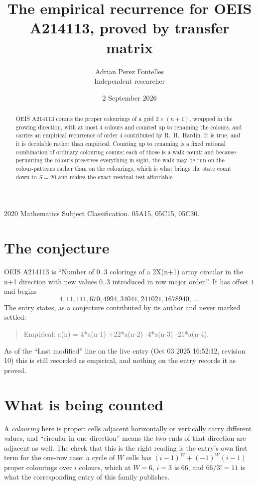 \documentclass[11pt,a4paper]{article}
\title{The empirical recurrence for OEIS A214113, proved by transfer matrix}
\author{Adrian Perez Fontelles\\ \small Independent researcher}
\date{2 September 2026}
\theoremstyle{plain}
\theoremstyle{definition}
\begin{document}
\maketitle

\begin{abstract}
OEIS A214113 counts the proper colourings of a grid $2\times(n+1)$, wrapped in the growing direction, with at most $4$ colours and
counted up to renaming the colours, and carries an empirical recurrence of order $4$
contributed by R.~H.~Hardin. It is true, and it is decidable rather than empirical. Counting
up to renaming is a fixed rational combination of ordinary colouring counts; each of those is
a walk count; and because permuting the colours preserves everything in sight, the walk may be
run on the colour-patterns rather than on the colourings, which is what brings the state count
down to $S=20$ and makes the exact residual test affordable.
\end{abstract}

\noindent\small 2020 Mathematics Subject Classification. 05A15, 05C15, 05C30.\normalsize

\section{The conjecture}

OEIS A214113 is ``Number of 0..3 colorings of a 2X(n+1) array circular in the n+1 direction with new values 0..3 introduced in row major order.''. It has offset $1$ and begins
\[
4, 11, 111, 670, 4994, 34041, 241021, 1678940,\ \dots
\]
The entry states, as a conjecture contributed by its author and never marked settled:
\begin{quote}
Empirical: a(n) = 4*a(n-1) +22*a(n-2) -4*a(n-3) -21*a(n-4).
\end{quote}
As of the ``Last modified'' line on the live entry (Oct 03 2025 16:52:12, revision 10) this is still
recorded as empirical, and nothing on the entry records it as proved.

\section{What is being counted}

A \emph{colouring} here is proper: cells adjacent horizontally or vertically carry different
values, and ``circular in one direction'' means the two ends of that direction are adjacent as
well. The check that this is the right reading is the entry's own first term for the
one-row case: a cycle of $W$ cells has $(i-1)^W+(-1)^W(i-1)$ proper colourings over $i$
colours, which at $W=6$, $i=3$ is $66$, and $66/3!=11$ is what the corresponding entry of this
family publishes.
\end{document}

